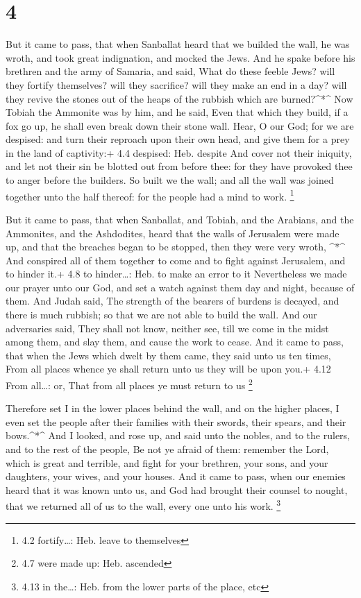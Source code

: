 \hypertarget{section-3}{%
\section{4}\label{section-3}}

 But it came to pass, that when Sanballat heard that we
builded the wall, he was wroth, and took great indignation, and mocked
the Jews.  And he spake before his brethren and the army of
Samaria, and said, What do these feeble Jews? will they fortify
themselves? will they sacrifice? will they make an end in a day? will
they revive the stones out of the heaps of the rubbish which are
burned?\^{}*\^{}  Now Tobiah the Ammonite was by him, and he
said, Even that which they build, if a fox go up, he shall even break
down their stone wall.  Hear, O our God; for we are
despised: and turn their reproach upon their own head, and give them for
a prey in the land of captivity:+ 4.4 despised: Heb. despite
 And cover not their iniquity, and let not their sin be
blotted out from before thee: for they have provoked thee to anger
before the builders.  So built we the wall; and all the wall
was joined together unto the half thereof: for the people had a mind to
work. \footnote{4.2 fortify\ldots: Heb. leave to themselves}

 But it came to pass, that when Sanballat, and Tobiah, and
the Arabians, and the Ammonites, and the Ashdodites, heard that the
walls of Jerusalem were made up, and that the breaches began to be
stopped, then they were very wroth, \^{}*\^{}  And conspired
all of them together to come and to fight against Jerusalem, and to
hinder it.+ 4.8 to hinder\ldots: Heb. to make an error to it
 Nevertheless we made our prayer unto our God, and set a
watch against them day and night, because of them.  And
Judah said, The strength of the bearers of burdens is decayed, and there
is much rubbish; so that we are not able to build the wall.
 And our adversaries said, They shall not know, neither
see, till we come in the midst among them, and slay them, and cause the
work to cease.  And it came to pass, that when the Jews
which dwelt by them came, they said unto us ten times, From all places
whence ye shall return unto us they will be upon you.+ 4.12 From
all\ldots: or, That from all places ye must return to us \footnote{4.7
  were made up: Heb. ascended}

 Therefore set I in the lower places behind the wall, and
on the higher places, I even set the people after their families with
their swords, their spears, and their bows.\^{}*\^{}  And I
looked, and rose up, and said unto the nobles, and to the rulers, and to
the rest of the people, Be not ye afraid of them: remember the Lord,
which is great and terrible, and fight for your brethren, your sons, and
your daughters, your wives, and your houses.  And it came
to pass, when our enemies heard that it was known unto us, and God had
brought their counsel to nought, that we returned all of us to the wall,
every one unto his work. \footnote{4.13 in the\ldots: Heb. from the
  lower parts of the place, etc}

